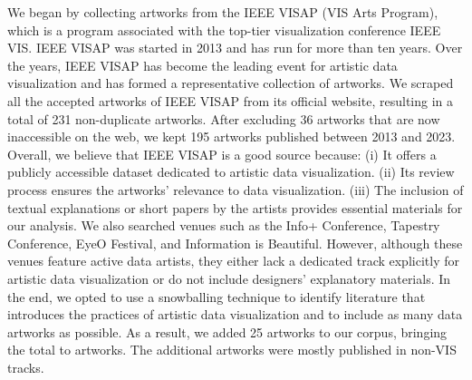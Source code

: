 We began by collecting artworks from the IEEE VISAP (VIS Arts Program), which is a program associated with the top-tier visualization conference IEEE VIS. 
IEEE VISAP was started in 2013 and has run for more than ten years. 
Over the years, IEEE VISAP has become the leading event for artistic data visualization and has formed a representative collection of artworks.
We scraped all the accepted artworks of IEEE VISAP from its official website, resulting in a total of 231 non-duplicate artworks. After excluding 36 artworks that are now inaccessible on the web, we kept 195 artworks published between 2013 and 2023.
Overall, we believe that IEEE VISAP is a good source because: (i) It offers a publicly accessible dataset dedicated to artistic data visualization. (ii) Its review process ensures the artworks' relevance to data visualization. (iii) The inclusion of textual explanations or short papers by the artists provides essential materials for our analysis.
We also searched venues such as the Info+ Conference, Tapestry Conference, EyeO Festival, and Information is Beautiful. However, although these venues feature active data artists, they either lack a dedicated track explicitly for artistic data visualization or do not include designers' explanatory materials.
In the end, we opted to use a snowballing technique to identify literature that introduces the practices of artistic data visualization and to include as many data artworks as possible.
As a result, we added 25 artworks to our corpus, bringing the total to \ncorpus artworks. The additional artworks were mostly published in non-VIS tracks.



